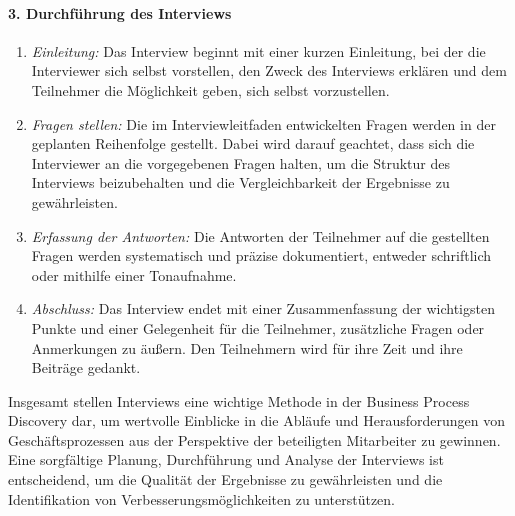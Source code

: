 \paragraph{3. Durchführung des Interviews}
\begin{enumerate}
\item \textit{Einleitung:} Das Interview beginnt mit einer kurzen Einleitung, bei der die Interviewer sich selbst vorstellen, den Zweck des Interviews erklären und dem Teilnehmer die Möglichkeit geben, sich selbst vorzustellen.
\item \textit{Fragen stellen:} Die im Interviewleitfaden entwickelten Fragen werden in der geplanten Reihenfolge gestellt. Dabei wird darauf geachtet, dass sich die Interviewer an die vorgegebenen Fragen halten, um die Struktur des Interviews beizubehalten und die Vergleichbarkeit der Ergebnisse zu gewährleisten.
\item \textit{Erfassung der Antworten:} Die Antworten der Teilnehmer auf die gestellten Fragen werden systematisch und präzise dokumentiert, entweder schriftlich oder mithilfe einer Tonaufnahme.
\item \textit{Abschluss:} Das Interview endet mit einer Zusammenfassung der wichtigsten Punkte und einer Gelegenheit für die Teilnehmer, zusätzliche Fragen oder Anmerkungen zu äußern. Den Teilnehmern wird für ihre Zeit und ihre Beiträge gedankt.
\end{enumerate}

Insgesamt stellen Interviews eine wichtige Methode in der Business Process Discovery dar, um wertvolle Einblicke in die Abläufe und Herausforderungen von Geschäftsprozessen aus der Perspektive der beteiligten Mitarbeiter zu gewinnen. Eine sorgfältige Planung, Durchführung und Analyse der Interviews ist entscheidend, um die Qualität der Ergebnisse zu gewährleisten und die Identifikation von Verbesserungsmöglichkeiten zu unterstützen.